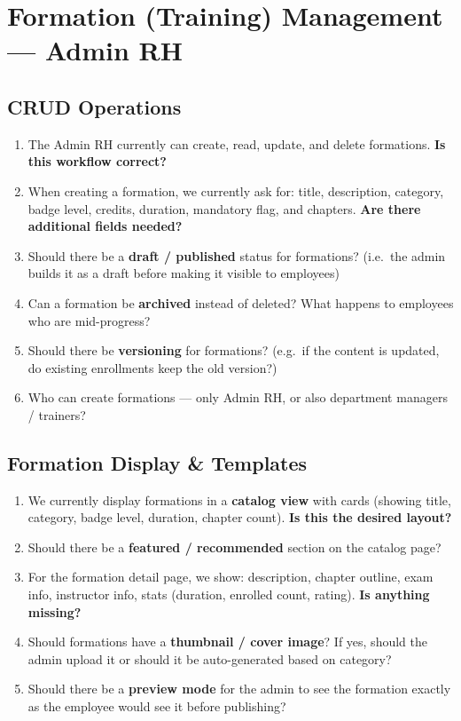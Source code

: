 \documentclass[11pt,a4paper]{article}
\begin{document}
\section{Formation (Training) Management --- Admin RH}

\subsection{CRUD Operations}
\begin{enumerate}[leftmargin=2em]
  \item The Admin RH currently can create, read, update, and delete formations. \textbf{Is this workflow correct?}
  \item When creating a formation, we currently ask for: title, description, category, badge level, credits, duration, mandatory flag, and chapters. \textbf{Are there additional fields needed?}
  \item Should there be a \textbf{draft / published} status for formations? (i.e.\ the admin builds it as a draft before making it visible to employees)
  \item Can a formation be \textbf{archived} instead of deleted? What happens to employees who are mid-progress?
  \item Should there be \textbf{versioning} for formations? (e.g.\ if the content is updated, do existing enrollments keep the old version?)
  \item Who can create formations --- only Admin RH, or also department managers / trainers?
\end{enumerate}

\subsection{Formation Display \& Templates}
\begin{enumerate}[leftmargin=2em]
  \item We currently display formations in a \textbf{catalog view} with cards (showing title, category, badge level, duration, chapter count). \textbf{Is this the desired layout?}
  \item Should there be a \textbf{featured / recommended} section on the catalog page?
  \item For the formation detail page, we show: description, chapter outline, exam info, instructor info, stats (duration, enrolled count, rating). \textbf{Is anything missing?}
  \item Should formations have a \textbf{thumbnail / cover image}? If yes, should the admin upload it or should it be auto-generated based on category?
  \item Should there be a \textbf{preview mode} for the admin to see the formation exactly as the employee would see it before publishing?
\end{enumerate}
\end{document}
